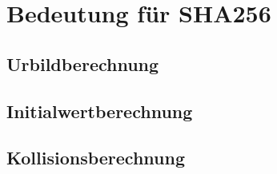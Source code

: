 \section{Bedeutung für SHA256}


\subsection{Urbildberechnung}

\subsection{Initialwertberechnung}

\subsection{Kollisionsberechnung}